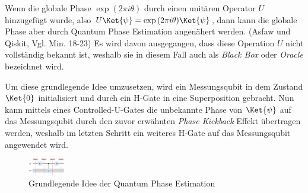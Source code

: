 Wenn die globale Phase  \(\exp{(2\pi i\theta)}\) durch einen unitären Operator \(U\) hinzugefügt wurde, also \(U\Ket{\psi} = \exp{(2\pi i\theta)}\Ket{\psi}\), dann kann die globale Phase aber durch Quantum Phase Estimation angenähert werden.  (Asfaw und Qiskit, Vgl. Min. 18-23) Es wird davon ausgegangen, dass diese Operation \(U\) nicht vollständig bekannt ist, weshalb sie in diesem Fall auch als \textit{Black Box} oder \textit{Oracle} bezeichnet wird. \newline \newline

\newline \newline
{}
\newline \newline

Um diese grundlegende Idee umzusetzen, wird ein Messungsqubit in dem Zustand \(\Ket{0}\) initialisiert und durch ein H-Gate in eine Superposition gebracht. Nun kann mittels eines Controlled-U-Gates die unbekannte Phase von \(\Ket{\psi}\) auf das Messungsqubit durch den zuvor erwähnten \textit{Phase Kickback} Effekt übertragen werden, weshalb im letzten Schritt ein weiteres H-Gate auf das Messungsqubit angewendet wird. \newline \newline

\begin{figure}
    \includegraphics[width=60]{content/qpe-idea.png}
    \caption{Grundlegende Idee der Quantum Phase Estimation}
\end{figure}    \newline

